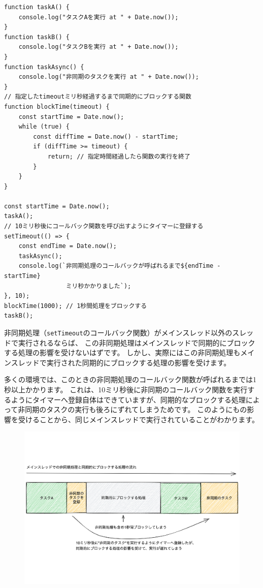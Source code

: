\begin{lstlisting}
function taskA() {
    console.log("タスクAを実行 at " + Date.now());
}
function taskB() {
    console.log("タスクBを実行 at " + Date.now());
}
function taskAsync() {
    console.log("非同期のタスクを実行 at " + Date.now());
}
// 指定したtimeoutミリ秒経過するまで同期的にブロックする関数
function blockTime(timeout) { 
    const startTime = Date.now();
    while (true) {
        const diffTime = Date.now() - startTime;
        if (diffTime >= timeout) {
            return; // 指定時間経過したら関数の実行を終了
        }
    }
}

const startTime = Date.now();
taskA();
// 10ミリ秒後にコールバック関数を呼び出すようにタイマーに登録する
setTimeout(() => {
    const endTime = Date.now();
    taskAsync();
    console.log(`非同期処理のコールバックが呼ばれるまで${endTime - startTime}
                 ミリ秒かかりました`);
}, 10);
blockTime(1000); // 1秒間処理をブロックする
taskB();
\end{lstlisting}

非同期処理（\texttt{setTimeout}のコールバック関数）がメインスレッド以外のスレッドで実行されるならば、
この非同期処理はメインスレッドで同期的にブロックする処理の影響を受けないはずです。
しかし、実際にはこの非同期処理もメインスレッドで実行された同期的にブロックする処理の影響を受けます。

多くの環境では、このときの非同期処理のコールバック関数が呼ばれるまでは1秒以上かかります。
これは、10ミリ秒後に非同期のコールバック関数を実行するようにタイマーへ登録自体はできていますが、同期的なブロックする処理によって非同期のタスクの実行も後ろにずれてしまうためです。
このように\textbf{}も\textbf{}の影響を受けることから、同じメインスレッドで実行されていることがわかります。

\begin{figure}[h]
\centering
\includegraphics[width=120mm]{fig/block-async-single-thread-tasks.pdf}
\end{figure}

